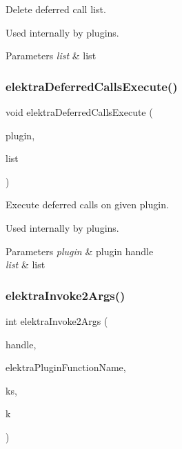 Delete deferred call list. 

Used internally by plugins.


\begin{DoxyParams}{Parameters}
{\em list} & list \\
\hline
\end{DoxyParams}
\mbox{\label{group__invoke_gad59c673dce3c2f08fbe52c5c667f55ce}} 
\subsubsection{\texorpdfstring{elektra\+Deferred\+Calls\+Execute()}{elektraDeferredCallsExecute()}}
{\footnotesize\ttfamily void elektra\+Deferred\+Calls\+Execute (\begin{DoxyParamCaption}\item[{Plugin $\ast$}]{plugin,  }\item[{Elektra\+Deferred\+Call\+List $\ast$}]{list }\end{DoxyParamCaption})}



Execute deferred calls on given plugin. 

Used internally by plugins.


\begin{DoxyParams}{Parameters}
{\em plugin} & plugin handle \\
\hline
{\em list} & list \\
\hline
\end{DoxyParams}
\mbox{\label{group__invoke_gaa257d93399c60f73c611205bbfa7c9a0}} 
\subsubsection{\texorpdfstring{elektra\+Invoke2\+Args()}{elektraInvoke2Args()}}
{\footnotesize\ttfamily int elektra\+Invoke2\+Args (\begin{DoxyParamCaption}\item[{Elektra\+Invoke\+Handle $\ast$}]{handle,  }\item[{const char $\ast$}]{elektra\+Plugin\+Function\+Name,  }\item[{Key\+Set $\ast$}]{ks,  }\item[{Key $\ast$}]{k }\end{DoxyParamCaption})}



